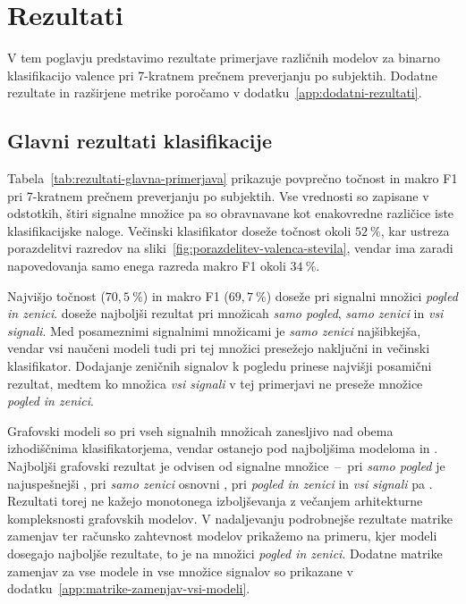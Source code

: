\chapter{Rezultati}
\label{sec:rezultati}

V tem poglavju predstavimo rezultate primerjave različnih modelov za binarno klasifikacijo valence pri 7-kratnem prečnem preverjanju po subjektih.
Dodatne rezultate in razširjene metrike poročamo v dodatku~\ref{app:dodatni-rezultati}.



\section{Glavni rezultati klasifikacije}
\label{subsec:rezultati-glavna-primerjava}
 
Tabela~\ref{tab:rezultati-glavna-primerjava} prikazuje povprečno točnost in makro F1 pri 7-kratnem prečnem preverjanju po subjektih.
Vse vrednosti so zapisane v odstotkih, štiri signalne množice pa so obravnavane kot enakovredne različice iste klasifikacijske naloge.
Večinski klasifikator doseže točnost okoli $52~\%$, kar ustreza porazdelitvi razredov na sliki~\ref{fig:porazdelitev-valenca-stevila}, vendar ima zaradi napovedovanja samo enega razreda makro F1 okoli $34~\%$.

Najvišjo točnost ($70{,}5~\%$) in makro F1 ($69{,}7~\%$) doseže  pri signalni množici \emph{pogled in zenici}.
 doseže najboljši rezultat pri množicah \emph{samo pogled}, \emph{samo zenici} in \emph{vsi signali}.
Med posameznimi signalnimi množicami je \emph{samo zenici} najšibkejša, vendar vsi naučeni modeli tudi pri tej množici presežejo naključni in večinski klasifikator.
Dodajanje zeničnih signalov k pogledu prinese najvišji posamični rezultat, medtem ko množica \emph{vsi signali} v tej primerjavi ne preseže množice \emph{pogled in zenici}.

Grafovski modeli so pri vseh signalnih množicah zanesljivo nad obema izhodiščnima klasifikatorjema, vendar ostanejo pod najboljšima modeloma  in .
Najboljši grafovski rezultat je odvisen od signalne množice~--~pri \emph{samo pogled} je najuspešnejši , pri \emph{samo zenici} osnovni , pri \emph{pogled in zenici} in \emph{vsi signali} pa .
Rezultati torej ne kažejo monotonega izboljševanja z večanjem arhitekturne kompleksnosti grafovskih modelov.
V nadaljevanju podrobnejše rezultate matrike zamenjav ter računsko zahtevnost modelov prikažemo na primeru, kjer modeli dosegajo najboljše rezultate, to je na množici \emph{pogled in zenici}.
Dodatne matrike zamenjav za vse modele in vse množice signalov so prikazane v dodatku~\ref{app:matrike-zamenjav-vsi-modeli}.


